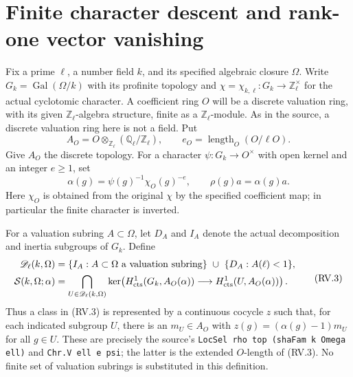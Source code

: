 \section{Finite character descent and rank-one vector vanishing}
\label{sec:rank-one-cohomology}


Fix a prime $\ell$, a number field $k$, and its specified algebraic
closure $\Omega$.  Write $G_k=\operatorname{Gal}(\Omega/k)$ with its
profinite topology and $\chi=\chi_{k,\ell}:G_k\to\mathbb Z_\ell^\times$
for the actual cyclotomic character.  A coefficient ring $O$ will be
a discrete valuation ring, with its given $\mathbb Z_\ell$-algebra
structure, finite as a $\mathbb Z_\ell$-module.  As in the source,
a discrete valuation ring here is not a field.  Put
\[
 A_O=O\otimes_{\mathbb Z_\ell}(\mathbb Q_\ell/\mathbb Z_\ell),
 \qquad
 e_O=\operatorname{length}_O(O/\ell O).
 \tag{RV.1}
\]
Give $A_O$ the discrete topology.  For a character
$\psi:G_k\to O^\times$ with open kernel and an integer $e\ge1$, set
\[
 \alpha(g)=\psi(g)^{-1}\chi_O(g)^{-e},\qquad
 \rho(g)a=\alpha(g)a.
 \tag{RV.2}
\]
Here $\chi_O$ is obtained from the original $\chi$ by the specified
coefficient map; in particular the finite character is inverted.

For a valuation subring $A\subset\Omega$, let $D_A$ and $I_A$ denote
the actual decomposition and inertia subgroups of $G_k$.  Define
\[
 \begin{aligned}
 \mathscr D_\ell(k,\Omega)&=
 \{I_A:A\subset\Omega\text{ a valuation subring}\}
 \ \cup\
 \{D_A:A(\ell)<1\},\\
 \mathcal S(k,\Omega;\alpha)&=
 \bigcap_{U\in\mathscr D_\ell(k,\Omega)}
 \ker\!\left(H^1_{\rm cts}(G_k,A_O(\alpha))
                  \longrightarrow H^1_{\rm cts}(U,A_O(\alpha))\right).
 \end{aligned}
 \tag{RV.3}
\]
Thus a class in (RV.3) is represented by a continuous cocycle $z$
such that, for each indicated subgroup $U$, there is an $m_U\in A_O$
with $z(g)=(\alpha(g)-1)m_U$ for all $g\in U$.
These are precisely the source's
\texttt{LocSel rho top (shaFam k Omega ell)} and
\texttt{Chr.V ell e psi}; the latter is the extended
$O$-length of (RV.3).
No finite set of valuation subrings is substituted in this definition.

